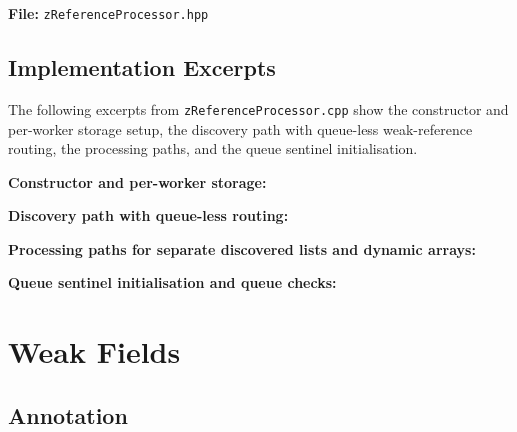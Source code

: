 \noindent\textbf{File:} \texttt{zReferenceProcessor.hpp}



\subsection{Implementation Excerpts}
\label{app:source-refproc-excerpts}

The following excerpts from \texttt{zReferenceProcessor.cpp} show the constructor and per-worker storage setup, the discovery path with queue-less weak-reference routing, the processing paths, and the queue sentinel initialisation.

\medskip
\noindent\textbf{Constructor and per-worker storage:}



\noindent\textbf{Discovery path with queue-less routing:}



\noindent\textbf{Processing paths for separate discovered lists and dynamic arrays:}



\noindent\textbf{Queue sentinel initialisation and queue checks:}



\section{Weak Fields}
\label{app:source-wf}

\subsection{Annotation}
\label{app:source-wf-annotation}

